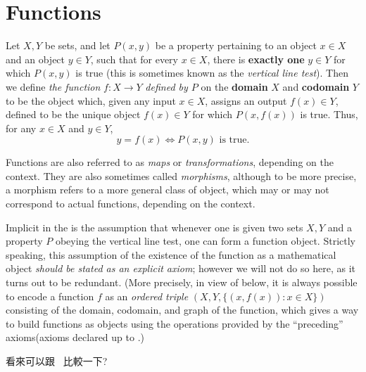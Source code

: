 \section{Functions} \label{sec 3.3}

\begin{definition} [Functions] \label{def 3.3.1}
Let \(X, Y\) be sets, and let \(P(x, y)\) be a property pertaining to an object \(x \in X\) and an object \(y \in Y\), such that for every \(x \in X\), there is \textbf{exactly one} \(y \in Y\) for which \(P(x, y)\) is true (this is sometimes known as the \emph{vertical line test}). Then we define \emph{the function} \(f : X \rightarrow Y\) \emph{defined by \(P\)} on the \textbf{domain} \(X\) and \textbf{codomain} \(Y\) to be the object which, given any input \(x \in X\), assigns an output \(f(x) \in Y\), defined to be the unique object \(f(x) \in Y\) for which \(P(x, f(x))\) is true. Thus, for any \(x \in X\) and \(y \in Y\),
\[
    y = f(x) \iff P(x, y) \text{ is true}.
\]
\end{definition}

\begin{note}
Functions are also referred to as \emph{maps} or \emph{transformations}, depending on the context. They are also sometimes called \emph{morphisms}, although to be more precise, a morphism refers to a more general class of object, which may or may not correspond to actual functions, depending on the context.

Implicit in the  is the assumption that whenever one is given two sets \(X, Y\) and a property \(P\) obeying the vertical line test, one can form a function object. Strictly speaking, this assumption of the existence of the function as a mathematical object \emph{should be stated as an explicit axiom}; however we will not do so here, as it turns out to be redundant. (More precisely, in view of  below, it is always possible to encode a function \(f\) as an \emph{ordered triple} \((X, Y, \{ (x,f(x)): x \in X \})\) consisting of the domain, codomain, and graph of the function, which gives a way to build functions as objects using the operations provided by the ``preceding'' axioms(axioms declared up to .)
\end{note}

\begin{note}
 看來可以跟\  比較一下?
\end{note}

